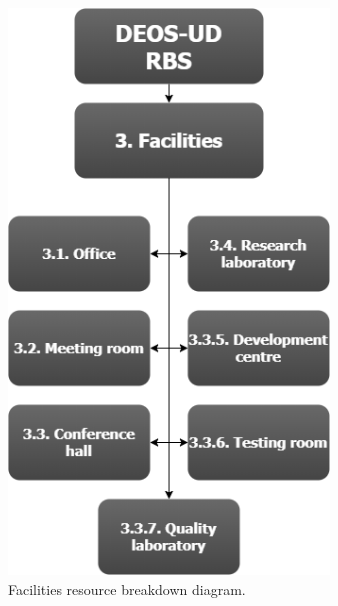 \begin{figure}[H]
	\centering
	\includegraphics[height=15cm,keepaspectratio]{./sections/4.Estimate_activity_resources/RBS_Section3}
	\caption[Facilities resource breakdown diagram]{Facilities resource breakdown diagram.}
	\label{fig:RBS_Section3}
\end{figure}